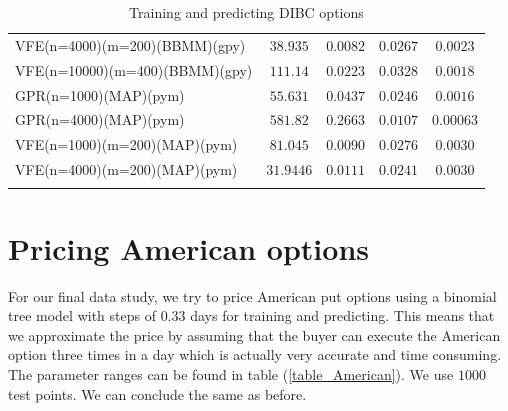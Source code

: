 \documentclass[12pt,a4paper,oneside]{book}
\begin{document}
\begin{table}
\begin{tabular}[t]{lcccc}
VFE(n=4000)(m=200)(BBMM)(gpy)   & $38.935$  & $0.0082$   & $0.0267$ & $0.0023$  \\\addlinespace
VFE(n=10000)(m=400)(BBMM)(gpy)   & $111.14$ & $0.0223$   & $0.0328$ & $0.0018$  \\\addlinespace
GPR(n=1000)(MAP)(pym)   & $55.631$  & $0.0437$   & $0.0246$ & $0.0016$ \\\addlinespace
GPR(n=4000)(MAP)(pym)   & $581.82$ & $0.2663$   & $0.0107$ & $0.00063$   \\\addlinespace
VFE(n=1000)(m=200)(MAP)(pym)   & $81.045$ & $0.0090$   & $0.0276$ & $0.0030$ \\\addlinespace
VFE(n=4000)(m=200)(MAP)(pym)   & $31.9446$ & $0.0111$   & $0.0241$  & $0.0030$ \\\addlinespace
\\\bottomrule
\end{tabular}
\caption{Training and predicting DIBC options}\label{Result_DIBC}
\end{table}

\fi

\clearpage

\section{Pricing American options} 

For our final data study, we try to price American put options using a binomial tree model with steps of $0.33$ days for training and predicting. This means that we approximate the price by assuming that the buyer can execute the American option three times in a day which is actually very accurate and time consuming. The parameter ranges can be found in table (\ref{table_American}). We use $1000$ test points. We can conclude the same as before. 
\end{document}
